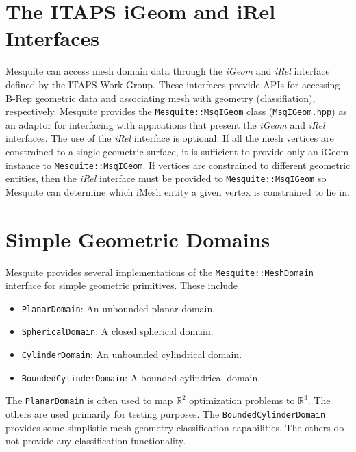 \section{The ITAPS iGeom and iRel Interfaces} \label{sec:ITAPS}

Mesquite can access mesh domain data through the \emph{iGeom} and \emph{iRel} interface defined by the ITAPS Work Group.  These interfaces provide APIs for accessing B-Rep geometric data and associating mesh with geometry (classifiation), respectively.  Mesquite provides the \texttt{Mesquite::MsqIGeom} class (\texttt{MsqIGeom.hpp}) as an adaptor for interfacing with appications that present the \emph{iGeom} and \emph{iRel} interfaces.  The use of the \emph{iRel} interface is optional.  If all the mesh vertices are constrained to a single geometric surface, it is sufficient to provide only an iGeom instance to \texttt{Mesquite::MsqIGeom}.  If vertices are constrained to different geometric entities, then the \emph{iRel} interface must be provided to \texttt{Mesquite::MsqIGeom} so Mesquite can determine which iMesh entity a given vertex is constrained to lie in.


\section{Simple Geometric Domains} \label{sec:MsqGeom}

Mesquite provides several implementations of the
\texttt{Mesquite::MeshDomain} interface for simple geometric primitives.  These
include
\begin{itemize}
\item \texttt{PlanarDomain}: An unbounded planar domain.
\item \texttt{SphericalDomain}: A closed spherical domain.
\item \texttt{CylinderDomain}: An unbounded cylindrical domain.
\item \texttt{BoundedCylinderDomain}: A bounded cylindrical domain.
\end{itemize}
The \texttt{PlanarDomain} is often used to map $\mathbb{R}^{2}$ optimization
problems to $\mathbb{R}^{3}$.  The others are used primarily for testing
purposes.  The \texttt{BoundedCylinderDomain} provides some simplistic
mesh-geometry classification capabilities.  The others do not provide any
classification functionality.  
